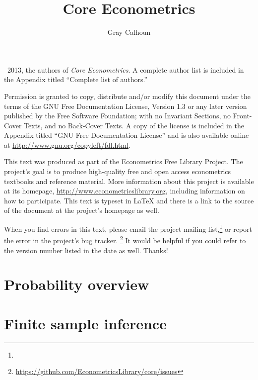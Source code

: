 \documentclass[11pt,notitlepage]{report}
\title{Core Econometrics}
\author{Gray Calhoun}
\begin{document}
\maketitle

\bigskip\noindent%
\textcopyright\ 2013, the authors of \textit{Core Econometrics}.  A
complete author list is included in the Appendix titled ``Complete
list of authors.''

Permission is granted to copy, distribute and/or modify this document
under the terms of the GNU Free Documentation License, Version 1.3 or
any later version published by the Free Software Foundation; with no
Invariant Sections, no Front-Cover Texts, and no Back-Cover Texts.  A
copy of the license is included in the Appendix titled ``GNU Free
Documentation License'' and is also available online at
\url{http://www.gnu.org/copyleft/fdl.html}.

This text was produced as part of the Econometrics Free Library
Project.  The project's goal is to produce high-quality free and
open access econometrics textbooks and reference material.  More
information about this project is available at its homepage,
\url{http://www.econometricslibrary.org}, including information on how
to participate.  This text is typeset in LaTeX and there is a link
to the source of the document at the project's homepage as well.

\addciteinfo %

When you find errors in this text, please email the project mailing
list,\footnote{} or report
the error in the project's bug tracker.%
\footnote{\url{https://github.com/EconometricsLibrary/core/issues}}
It would be helpful if you could refer to the version number listed in
the date as well.  Thanks!

\tableofcontents

\part{Probability overview}


\begin{appendices}

\end{appendices}

\part{Finite sample inference}









\begin{appendices}

\end{appendices}
\end{document}
